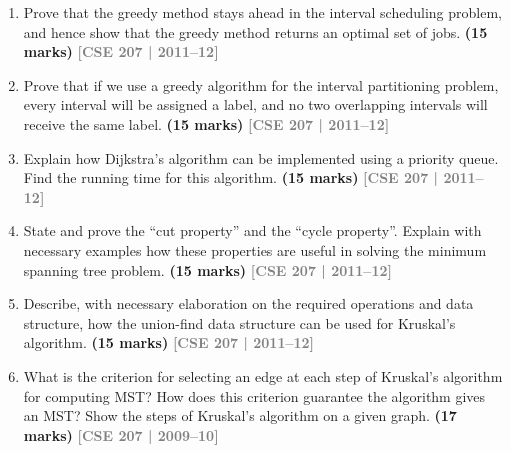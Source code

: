 \documentclass[12pt,a3paper]{article}
\newcommand{\yr}[1]{\hfill\textcolor{gray}{\small\textbf{[#1]}}}
\newcommand{\mk}[1]{\textcolor{orange!70!black}{\small\textbf{(#1 marks)}}}
\begin{document}
\begin{enumerate}
\item Prove that the greedy method stays ahead in the interval scheduling problem, and hence show that the greedy method returns an optimal set of jobs. \mk{15}
\yr{CSE 207 | 2011--12}

\item Prove that if we use a greedy algorithm for the interval partitioning problem, every interval will be assigned a label, and no two overlapping intervals will receive the same label. \mk{15}
\yr{CSE 207 | 2011--12}

\item Explain how Dijkstra's algorithm can be implemented using a priority queue. Find the running time for this algorithm. \mk{15}
\yr{CSE 207 | 2011--12}

\item State and prove the ``cut property'' and the ``cycle property''. Explain with necessary examples how these properties are useful in solving the minimum spanning tree problem. \mk{15}
\yr{CSE 207 | 2011--12}

\item Describe, with necessary elaboration on the required operations and data structure, how the union-find data structure can be used for Kruskal's algorithm. \mk{15}
\yr{CSE 207 | 2011--12}

\item What is the criterion for selecting an edge at each step of Kruskal's algorithm for computing MST? How does this criterion guarantee the algorithm gives an MST? Show the steps of Kruskal's algorithm on a given graph. \mk{17}
\yr{CSE 207 | 2009--10}


\end{enumerate}
\end{document}
